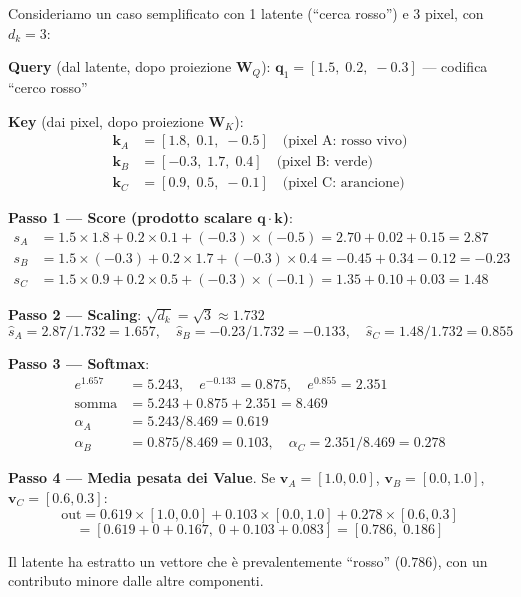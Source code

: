 \documentclass[12pt,a4paper]{article}
\begin{document}
\begin{examplebox}
Consideriamo un caso semplificato con 1 latente (``cerca rosso'') e 3 pixel, con $d_k = 3$:

\textbf{Query} (dal latente, dopo proiezione $\mathbf{W}_Q$):
$\mathbf{q}_1 = [1.5,\; 0.2,\; -0.3]$ --- codifica ``cerco rosso''

\textbf{Key} (dai pixel, dopo proiezione $\mathbf{W}_K$):
\begin{align*}
    \mathbf{k}_A &= [1.8,\; 0.1,\; -0.5] \quad \text{(pixel A: rosso vivo)} \\
    \mathbf{k}_B &= [-0.3,\; 1.7,\; 0.4] \quad \text{(pixel B: verde)} \\
    \mathbf{k}_C &= [0.9,\; 0.5,\; -0.1] \quad \text{(pixel C: arancione)}
\end{align*}

\textbf{Passo 1 --- Score (prodotto scalare $\mathbf{q} \cdot \mathbf{k}$)}:
\begin{align*}
    s_A &= 1.5 \times 1.8 + 0.2 \times 0.1 + (-0.3) \times (-0.5) = 2.70 + 0.02 + 0.15 = 2.87 \\
    s_B &= 1.5 \times (-0.3) + 0.2 \times 1.7 + (-0.3) \times 0.4 = -0.45 + 0.34 - 0.12 = -0.23 \\
    s_C &= 1.5 \times 0.9 + 0.2 \times 0.5 + (-0.3) \times (-0.1) = 1.35 + 0.10 + 0.03 = 1.48
\end{align*}

\textbf{Passo 2 --- Scaling}: $\sqrt{d_k} = \sqrt{3} \approx 1.732$
\[
    \hat{s}_A = 2.87 / 1.732 = 1.657, \quad \hat{s}_B = -0.23 / 1.732 = -0.133, \quad \hat{s}_C = 1.48 / 1.732 = 0.855
\]

\textbf{Passo 3 --- Softmax}:
\begin{align*}
    e^{1.657} &= 5.243, \quad e^{-0.133} = 0.875, \quad e^{0.855} = 2.351 \\
    \text{somma} &= 5.243 + 0.875 + 2.351 = 8.469 \\
    \alpha_A &= 5.243 / 8.469 = \mathbf{0.619} \\
    \alpha_B &= 0.875 / 8.469 = \mathbf{0.103}, \quad \alpha_C = 2.351 / 8.469 = \mathbf{0.278}
\end{align*}

\textbf{Passo 4 --- Media pesata dei Value}. Se $\mathbf{v}_A = [1.0, 0.0]$, $\mathbf{v}_B = [0.0, 1.0]$, $\mathbf{v}_C = [0.6, 0.3]$:
\[
    \text{out} = 0.619 \!\times\! [1.0, 0.0] + 0.103 \!\times\! [0.0, 1.0] + 0.278 \!\times\! [0.6, 0.3]
\]
\[
    = [0.619 + 0 + 0.167,\; 0 + 0.103 + 0.083] = [0.786,\; 0.186]
\]

Il latente ha estratto un vettore che \`e prevalentemente ``rosso'' ($0.786$), con un contributo minore dalle altre componenti.
\end{examplebox}
\end{document}
